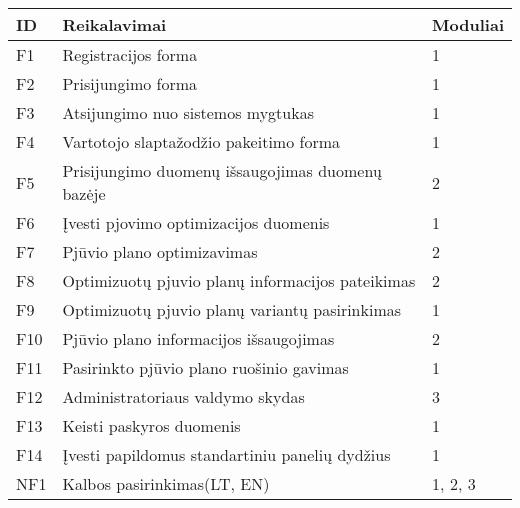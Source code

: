 \documentclass[a4paper,12pt]{article}
\begin{document}
\begin{frame}
\centering

\label{my-label}
\begin{tabular}{|l|l|l|}
\hline
\textbf{ID}              & \textbf{Reikalavimai}               & \textbf{Moduliai}  \\ \hline
F1                       & Registracijos forma                	   & 1      \\ \hline

F2                       & Prisijungimo forma                		   & 1      \\ \hline

F3						& Atsijungimo nuo sistemos mygtukas 	       & 1		\\ \hline

F4                       & Vartotojo slaptažodžio pakeitimo forma   & 1      \\ \hline

F5						& Prisijungimo duomenų išsaugojimas duomenų bazėje 
																   & 2		\\ \hline


F6                       & Įvesti pjovimo optimizacijos duomenis      	   & 1            \\ \hline
F7                       & Pjūvio plano optimizavimas           	   & 2            \\ \hline

F8                       & Optimizuotų pjuvio planų informacijos pateikimas 																  						 & 2      \\ \hline

F9                       & Optimizuotų pjuvio planų variantų pasirinkimas 																   					   & 1      \\ \hline

F10                      & Pjūvio plano informacijos išsaugojimas 
															      & 2       \\ \hline

F11                      & Pasirinkto pjūvio plano ruošinio gavimas& 1       \\ \hline


F12						& Administratoriaus valdymo skydas	 	  & 3			\\ \hline

F13						& Keisti paskyros duomenis	 	  & 1			\\ \hline 
F14						& Įvesti papildomus standartiniu panelių dydžius	 	  & 1		\\ \hline

NF1                      & Kalbos pasirinkimas(LT, EN)       	     & 1, 2, 3                 \\ \hline
\end{tabular}
\end{frame}
\end{document}

